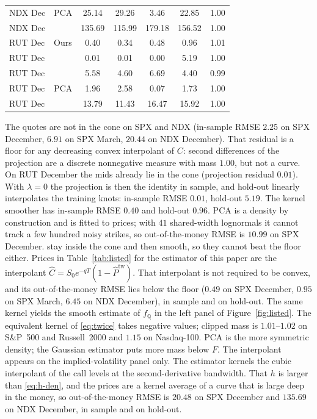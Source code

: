 \documentclass[preprint,12pt,authoryear,times]{elsarticle}
\newcommand{\Q}{\mathbb{Q}}
\begin{document}
\begin{table}[H]
{\begin{tabular}{ll *{5}{S[table-format=3.2]}}
NDX Dec & PCA
  & 25.14 & 29.26 & 3.46 & 22.85 & 1.00 \\
NDX Dec & \citeauthor{priestley1972}
  & 135.69 & 115.99 & 179.18 & 156.52 & 1.00 \\
\midrule
RUT Dec & Ours
  & 0.40 & 0.34 & 0.48 & 0.96 & 1.01 \\
RUT Dec & \citeauthor{yatchew2006}
  & 0.01 & 0.01 & 0.00 & 5.19 & 1.00 \\
RUT Dec & \citeauthor{aitsahalia2003}
  & 5.58 & 4.60 & 6.69 & 4.40 & 0.99 \\
RUT Dec & PCA
  & 1.96 & 2.58 & 0.07 & 1.73 & 1.00 \\
RUT Dec & \citeauthor{priestley1972}
  & 13.79 & 11.43 & 16.47 & 15.92 & 1.00 \\
\bottomrule
\end{tabular}%
}
\end{table}

The quotes are not in the \citeauthor{yatchew2006} cone on SPX and NDX (in-sample RMSE \(2.25\) on SPX December, \(6.91\) on SPX March, \(20.44\) on NDX December). That residual is a floor for any decreasing convex interpolant of \(C\): second differences of the projection are a discrete nonnegative measure with mass \(1.00\), but not a curve. On RUT December the mids already lie in the cone (projection residual \(0.01\)). With \(\lambda=0\) the projection is then the identity in sample, and hold-out linearly interpolates the training knots: in-sample RMSE \(0.01\), hold-out \(5.19\). The kernel smoother has in-sample RMSE \(0.40\) and hold-out \(0.96\). PCA is a density by construction and is fitted to prices; with \(41\) shared-width lognormals it cannot track a few hundred noisy strikes, so out-of-the-money RMSE is \(10.99\) on SPX December. \citeauthor{aitsahalia2003} stay inside the cone and then smooth, so they cannot beat the floor either. Prices in Table~\ref{tab:listed} for the estimator of this paper are the interpolant \(\hat C=S_0e^{-qT}(1-\hat P^{\mathrm{tw}})\). That interpolant is not required to be convex, and its out-of-the-money RMSE lies below the floor (\(0.49\) on SPX December, \(0.95\) on SPX March, \(6.45\) on NDX December), in sample and on hold-out. The same kernel yields the smooth estimate of \(f_{\Q}\) in the left panel of Figure~\ref{fig:listed}. The equivalent kernel of \eqref{eq:twice} takes negative values; clipped mass is \(1.01\)--\(1.02\) on S\&P~500 and Russell~2000 and \(1.15\) on Nasdaq-100. PCA is the more symmetric density; the Gaussian estimator puts more mass below \(F\). The \citeauthor{yatchew2006} interpolant appears on the implied-volatility panel only. The \citeauthor{priestley1972} estimator kernels the cubic interpolant of the call levels at the second-derivative bandwidth. That \(h\) is larger than \eqref{eq:h-den}, and the prices are a kernel average of a curve that is large deep in the money, so out-of-the-money RMSE is \(20.48\) on SPX December and \(135.69\) on NDX December, in sample and on hold-out.
\end{document}
